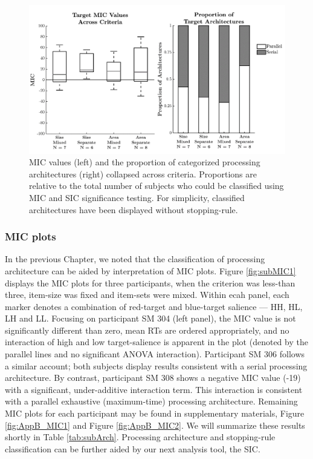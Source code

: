 \begin{figure}[hbt]
\centering \includegraphics[width=\linewidth]{Figures/Subitizing/ArchSummary3v2.pdf}
\caption{MIC values (left) and the proportion of categorized processing architectures (right) collapsed across criteria. Proportions are relative to the total number of subjects who could be classified using MIC and SIC significance testing. For simplicity, classified architectures have been displayed without stopping-rule.}
\label{fig:subArchSummary}
\end{figure}

\subsubsection{MIC plots}
In the previous Chapter, we noted that the classification of processing architecture can be aided by interpretation of MIC plots. Figure \ref{fig:subMIC1} displays the MIC plots for three participants, when the criterion was less-than three, item-size was fixed and item-sets were mixed. Within ecah panel, each marker denotes a combination of red-target and blue-target salience --- HH, HL, LH and LL. Focusing on %
participant SM 304 (left panel), the MIC value is not significantly different than zero, mean RTs are ordered appropriately, and no interaction of high and low target-salience is apparent in the plot (denoted by the parallel lines and no significant ANOVA interaction). Participant SM 306 follows a similar account; both subjects display results consistent with a serial processing architecture. By contrast, participant SM 308 shows a negative MIC value (-19) with a significant, under-additive interaction term. This interaction is consistent with a parallel exhaustive (maximum-time) processing architecture. Remaining MIC plots for each participant may be found in supplementary materials, Figure \ref{fig:AppB_MIC1} and Figure \ref{fig:AppB_MIC2}. We will summarize these results shortly in Table \ref{tab:subArch}. Processing architecture and stopping-rule classification can be further aided by our next analysis tool, the SIC. 

